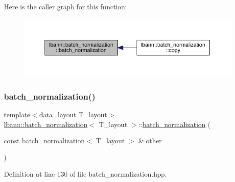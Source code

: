 Here is the caller graph for this function\+:\nopagebreak
\begin{figure}[H]
\begin{center}
\leavevmode
\includegraphics[width=350pt]{classlbann_1_1batch__normalization_a04f092712566fd732e5fc5e48ee16f4d_icgraph}
\end{center}
\end{figure}
\mbox{\label{classlbann_1_1batch__normalization_a62e642fc7c064a49826e5d4a10a87e5c}} 
\subsubsection{\texorpdfstring{batch\+\_\+normalization()}{batch\_normalization()}\hspace{0.1cm}{\footnotesize\ttfamily [2/2]}}
{\footnotesize\ttfamily template$<$data\+\_\+layout T\+\_\+layout$>$ \\
\hyperlink{classlbann_1_1batch__normalization}{lbann\+::batch\+\_\+normalization}$<$ T\+\_\+layout $>$\+::\hyperlink{classlbann_1_1batch__normalization}{batch\+\_\+normalization} (\begin{DoxyParamCaption}\item[{const \hyperlink{classlbann_1_1batch__normalization}{batch\+\_\+normalization}$<$ T\+\_\+layout $>$ \&}]{other }\end{DoxyParamCaption})\hspace{0.3cm}{\ttfamily [inline]}}



Definition at line 130 of file batch\+\_\+normalization.\+hpp.


